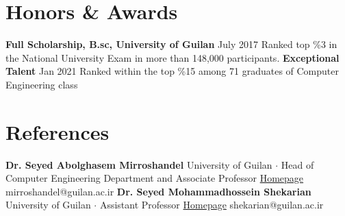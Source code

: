 \documentclass[paper=a4,fontsize=11pt]{scrartcl} %
\newcommand{\NewPart}[1]{\section*{{#1}}}
\begin{document}
\NewPart{Honors \& Awards}
\textbf{Full Scholarship, B.sc, University of Guilan} \hfill July 2017 \newline
\footnotesize Ranked top \%3 in the National University Exam in more than 148,000 participants. \newline
\newline
\textbf{Exceptional Talent} \hfill Jan 2021 \newline
\footnotesize Ranked within the top \%15 among 71 graduates of Computer Engineering class

\NewPart{References}

\textbf{Dr. Seyed Abolghasem Mirroshandel} \hfill University of Guilan \newline
\footnotesize $\cdot$ Head of Computer Engineering Department and Associate Professor \hfill \href{https://staff.guilan.ac.ir/mirroshandel/?lg=1}{Homepage}  \newline
\footnotesize mirroshandel@guilan.ac.ir \newline
\newline
\newline
\textbf{Dr. Seyed Mohammadhossein Shekarian} \hfill University of Guilan \newline
\footnotesize $\cdot$ Assistant Professor \hfill \href{https://staff.guilan.ac.ir/shekarian/index.php?a=0&lg=1}{Homepage} \newline
\footnotesize shekarian@guilan.ac.ir \newline
\end{document}
